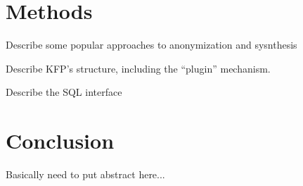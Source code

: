 \documentclass{article}
\begin{document}
\section{Methods}

Describe some popular approaches to anonymization and sysnthesis

Describe KFP's structure, including the ``plugin'' mechanism.

Describe the SQL interface



\section{Conclusion}

Basically need to put abstract here...











\end{document}
